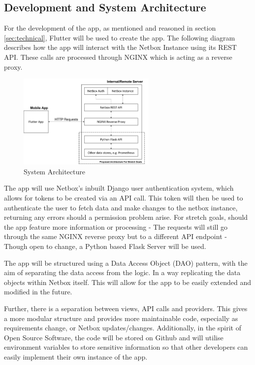 \documentclass [11pt,a4paper]{article}
\begin{document}
\subsection{Development and System Architecture}
\label{sec:development} 
For the development of the app, as mentioned and reasoned in section \ref{sec:technical}, Flutter will be used to create the app. The following diagram describes how the app will interact with the Netbox Instance using its REST API. These calls are processed through NGINX which is acting as a reverse proxy.
\begin{figure}[h]
    \centering
    \includegraphics[width=0.6\textwidth]{images/top-level-archi.png}
    \caption{System Architecture}
    \label{fig:architecture}
\end{figure}

The app will use Netbox's inbuilt Django user authentication system, which allows for tokens to be created via an API call. This token will then be used to authenticate the user to fetch data and make changes to the netbox instance, returning any errors should a permission problem arise. For stretch goals, should the app feature more information or processing - The requests will still go through the same NGINX reverse proxy but to a different API endpoint - Though open to change, a Python based Flask Server will be used. 

The app will be structured using a Data Access Object (DAO) pattern\cite{dao}, with the aim of separating the data access from the logic. In a way replicating the data objects within Netbox itself. This will allow for the app to be easily extended and modified in the future. 

Further, there is a separation between views, API calls and providers. This gives a more modular structure and provides more maintainable code, especially as requirements change, or Netbox updates/changes. Additionally, in the spirit of Open Source Software, the code will be stored on Github \cite{keeptrackgithub} and will utilise environment variables to store sensitive information so that other developers can easily implement their own instance of the app.
\end{document}
